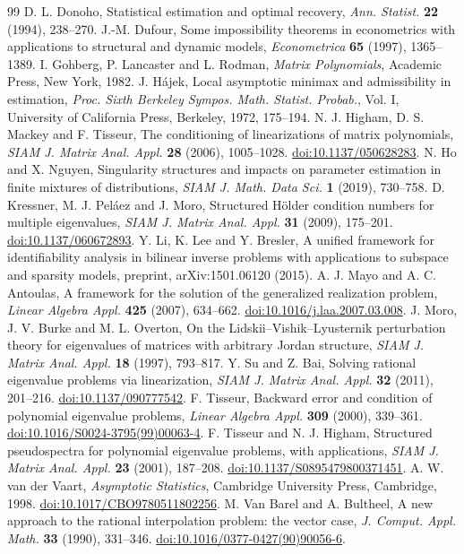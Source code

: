 \begin{thebibliography}{99}
 D. L. Donoho, Statistical estimation and optimal recovery,
\emph{Ann. Statist.} \textbf{22} (1994), 238--270.
 J.-M. Dufour, Some impossibility theorems in econometrics
with applications to structural and dynamic models,
\emph{Econometrica} \textbf{65} (1997), 1365--1389.
 I. Gohberg, P. Lancaster and L. Rodman,
\emph{Matrix Polynomials}, Academic Press, New York, 1982.
 J. H\'ajek,
Local asymptotic minimax and admissibility in estimation,
\emph{Proc. Sixth Berkeley Sympos. Math. Statist. Probab.},
Vol. I, University of California Press, Berkeley, 1972, 175--194.
 N. J. Higham, D. S. Mackey and F. Tisseur,
The conditioning of linearizations of matrix polynomials,
\emph{SIAM J. Matrix Anal. Appl.} \textbf{28} (2006), 1005--1028.
\href{https://doi.org/10.1137/050628283}{doi:10.1137/050628283}.
 N. Ho and X. Nguyen, Singularity structures and impacts on
parameter estimation in finite mixtures of distributions,
\emph{SIAM J. Math. Data Sci.} \textbf{1} (2019), 730--758.
 D. Kressner, M. J. Pel\'aez and J. Moro,
Structured H\"older condition numbers for multiple eigenvalues,
\emph{SIAM J. Matrix Anal. Appl.} \textbf{31} (2009), 175--201.
\href{https://doi.org/10.1137/060672893}{doi:10.1137/060672893}.
 Y. Li, K. Lee and Y. Bresler,
A unified framework for identifiability analysis in bilinear inverse
problems with applications to subspace and sparsity models,
preprint, arXiv:1501.06120 (2015).
 A. J. Mayo and A. C. Antoulas,
A framework for the solution of the generalized realization problem,
\emph{Linear Algebra Appl.} \textbf{425} (2007), 634--662.
\href{https://doi.org/10.1016/j.laa.2007.03.008}{doi:10.1016/j.laa.2007.03.008}.
 J. Moro, J. V. Burke and M. L. Overton,
On the Lidskii--Vishik--Lyusternik perturbation theory for eigenvalues
of matrices with arbitrary Jordan structure,
\emph{SIAM J. Matrix Anal. Appl.} \textbf{18} (1997), 793--817.
 Y. Su and Z. Bai,
Solving rational eigenvalue problems via linearization,
\emph{SIAM J. Matrix Anal. Appl.} \textbf{32} (2011), 201--216.
\href{https://doi.org/10.1137/090777542}{doi:10.1137/090777542}.
 F. Tisseur,
Backward error and condition of polynomial eigenvalue problems,
\emph{Linear Algebra Appl.} \textbf{309} (2000), 339--361.
\href{https://doi.org/10.1016/S0024-3795(99)00063-4}{doi:10.1016/S0024-3795(99)00063-4}.
 F. Tisseur and N. J. Higham,
Structured pseudospectra for polynomial eigenvalue problems, with
applications, \emph{SIAM J. Matrix Anal. Appl.} \textbf{23} (2001), 187--208.
\href{https://doi.org/10.1137/S0895479800371451}{doi:10.1137/S0895479800371451}.
 A. W. van der Vaart,
\emph{Asymptotic Statistics}, Cambridge University Press, Cambridge, 1998.
\href{https://doi.org/10.1017/CBO9780511802256}{doi:10.1017/CBO9780511802256}.
 M. Van Barel and A. Bultheel,
A new approach to the rational interpolation problem: the vector case,
\emph{J. Comput. Appl. Math.} \textbf{33} (1990), 331--346.
\href{https://doi.org/10.1016/0377-0427(90)90056-6}{doi:10.1016/0377-0427(90)90056-6}.
\end{thebibliography}
